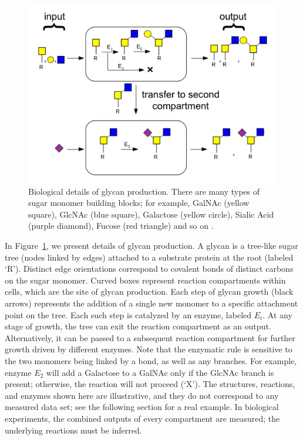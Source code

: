 \begin{figure}[t]
  \centering
  \begin{minipage}{0.54\linewidth}
    \includegraphics[width=0.9\linewidth]{gfig1.png}    
  \end{minipage}
  \begin{minipage}{0.44\linewidth}
    \caption{Biological details of glycan production. There are many types of sugar monomer building blocks; %
      for example, GalNAc (yellow square), GlcNAc (blue square), Galactose (yellow circle), Sialic Acid (purple diamond), Fucose (red triangle) and so on \cite{Varki2017}.}
    \label{fig:glycan-rule}
  \end{minipage}
\end{figure}

In Figure~\ref{fig:glycan-rule}, we present details of glycan production. A glycan is a tree-like sugar tree (nodes linked by edges) attached to a substrate protein at the root (labeled `R'). Distinct edge orientations correspond to covalent bonds of distinct carbons on the sugar monomer. Curved boxes represent reaction compartments within cells, which are the site of glycan production. Each step of glycan growth (black arrows) represents the addition of a single new monomer to a specific attachment point on the tree. Each such step is catalyzed by an enzyme, labeled $E_i$. At any stage of growth, the tree can exit the reaction compartment as an output. Alternatively, it can be passed to a subsequent reaction compartment for further growth driven by different enzymes. Note that the enzymatic rule is sensitive to the two monomers being linked by a bond, as well as any branches. For example, enzyme $E_2$ will add a Galactose to a GalNAc only if the GlcNAc branch is present; otherwise, the reaction will not proceed (`X'). The structures, reactions, and enzymes shown here are illustrative, and they do not correspond to any measured data set; see the following section for a real example. In biological experiments, the combined outputs of every compartment are measured; the underlying reactions must be inferred.


